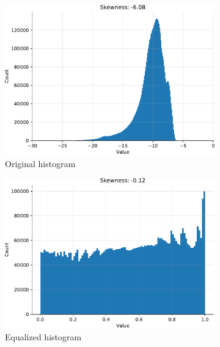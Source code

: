 \documentclass[10pt]{article}
\begin{document}
\begin{figure}[H]
    \centering
    \begin{subfigure}{.49\textwidth}
        \centering
        \includegraphics[width=\textwidth]{Skew_GMM_wo_cl1}
        \caption{Original histogram}
    \end{subfigure}
    \begin{subfigure}{.49\textwidth}
        \centering
        \includegraphics[width=\textwidth]{Skew_GMM_wo_cl1_eq}
        \caption{Equalized histogram}
    \end{subfigure}
    \begin{subfigure}{.45\textwidth}
        \centering

\end{subfigure}
\end{figure}
\end{document}
